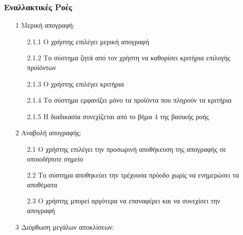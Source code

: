 \documentclass[12pt,a4paper,twoside]{book}
\begin{document}
\subsubsection{Εναλλακτικές Ροές}
\begin{enumerate}
  \item[1 ] Μερική απογραφή:
        \begin{enumerate}
          \item[2.1.1 ] Ο χρήστης επιλέγει μερική απογραφή
          \item[2.1.2 ] Το σύστημα ζητά από τον χρήστη να καθορίσει κριτήρια επιλογής προϊόντων
          \item[2.1.3 ] Ο χρήστης επιλέγει κριτήρια %
          \item[2.1.4 ] Το σύστημα εμφανίζει μόνο τα προϊόντα που πληρούν τα κριτήρια
          \item[2.1.5 ] Η διαδικασία συνεχίζεται από το βήμα 4 της βασικής ροής
        \end{enumerate}
  \item[2 ] Αναβολή απογραφής:
        \begin{enumerate}
          \item [2.1 ] Ο χρήστης επιλέγει την προσωρινή αποθήκευση της απογραφής σε οποιοδήποτε σημείο
          \item [2.2 ] Το σύστημα αποθηκεύει την τρέχουσα πρόοδο χωρίς να ενημερώσει τα αποθέματα
          \item [2.3 ] Ο χρήστης μπορεί αργότερα να επαναφέρει και να συνεχίσει την απογραφή
        \end{enumerate}
  \item[3 ] Διόρθωση μεγάλων αποκλίσεων:

\end{enumerate}
\end{document}
